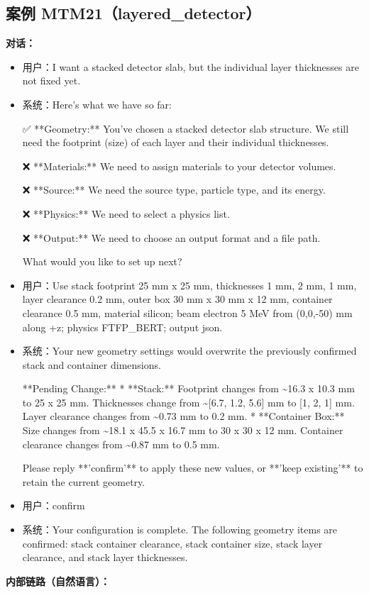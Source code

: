\documentclass[11pt]{ctexart}
\begin{document}
\subsection{案例 MTM21（layered\_detector）}
\textbf{对话：}
\begin{itemize}
\item 用户：I want a stacked detector slab, but the individual layer thicknesses are not fixed yet.
\item 系统：Here's what we have so far:

✅ **Geometry:** You've chosen a stacked detector slab structure. We still need the footprint (size) of each layer and their individual thicknesses.

❌ **Materials:** We need to assign materials to your detector volumes.

❌ **Source:** We need the source type, particle type, and its energy.

❌ **Physics:** We need to select a physics list.

❌ **Output:** We need to choose an output format and a file path.

What would you like to set up next?
\item 用户：Use stack footprint 25 mm x 25 mm, thicknesses 1 mm, 2 mm, 1 mm, layer clearance 0.2 mm, outer box 30 mm x 30 mm x 12 mm, container clearance 0.5 mm, material silicon; beam electron 5 MeV from (0,0,-50) mm along +z; physics FTFP\_BERT; output json.
\item 系统：Your new geometry settings would overwrite the previously confirmed stack and container dimensions.

**Pending Change:**
*   **Stack:** Footprint changes from \textasciitilde{}16.3 x 10.3 mm to 25 x 25 mm. Thicknesses change from \textasciitilde{}[6.7, 1.2, 5.6] mm to [1, 2, 1] mm. Layer clearance changes from \textasciitilde{}0.73 mm to 0.2 mm.
*   **Container Box:** Size changes from \textasciitilde{}18.1 x 45.5 x 16.7 mm to 30 x 30 x 12 mm. Container clearance changes from \textasciitilde{}0.87 mm to 0.5 mm.

Please reply **'confirm'** to apply these new values, or **'keep existing'** to retain the current geometry.
\item 用户：confirm
\item 系统：Your configuration is complete. The following geometry items are confirmed: stack container clearance, stack container size, stack layer clearance, and stack layer thicknesses.
\end{itemize}
\textbf{内部链路（自然语言）：}
\end{document}
